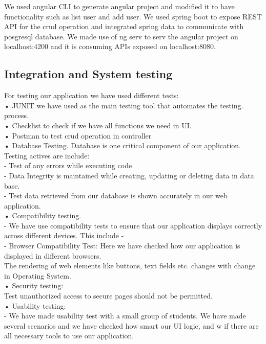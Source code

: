\documentclass{scrartcl}
\begin{document}

 
 
 
We used angular CLI to generate angular project and modified it to have functionality such as list user and add user. We used spring boot to expose REST API for the crud operation and integrated spring data to communicate with posgresql database. We made use of ng serv to serv the angular project on localhost:4200 and it is consuming APIs exposed on localhost:8080. 



\subsection{Integration and System testing}
For testing  our application we have used different tests:\\
• JUNIT we have used as the main testing tool that automates the testing.\\ process.\\
• Checklist to check if we have all functions we need in UI.\\
• Postman to test crud operation in controller\\
• Database Testing. Database is one critical component of our application. Testing actives are include:\\
 - Test of any errors while executing code\\
 - Data Integrity is maintained while creating, updating or deleting data in data base.\\
 - Test data retrieved from our database is shown accurately in our web application.\\
• Compatibility testing.\\
 - We have use compatibility tests to ensure that our application displays correctly across different devices. This include -\\
 - Browser Compatibility Test: Here we have checked how our application is displayed in different browsers.\\
   The rendering of web elements like buttons, text fields etc. changes with change in Operating System.\\
• Security testing: \\
   Test unauthorized access to secure pages should not be permitted.\\
• Usability testing:\\
  - We have made usability test with a small group of students. We have made several scenarios and we have checked how smart our UI logic, and w if there are all necessary tools to use our application.\\
\end{document}
